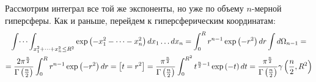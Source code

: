 \documentclass[14pt]{article}
\newcommand{\lb}{\left(}
\newcommand{\rb}{\right)}
\begin{document}
Рассмотрим интеграл все той же экспоненты, но уже по объему $n$-мерной гиперсферы. Как и раньше, перейдем к гиперсферическим координатам:
\begin{gather}
	\int \dots \int_{x_1^2 + \dots + x_n^2 \leq R^2} \exp \lb -x_1^2 - \dots - x_n^2 \rb dx_1 \dots dx_n = \int_{0}^{R} r^{n-1} \exp \lb -r^2 \rb dr \int d \Omega_{n-1} = \notag \\
	= \frac{2 \pi^{\frac{n}{2}}}{\Gamma \lb \frac{n}{2} \rb} \int_{0}^{R} r^{n-1} \exp \lb -r^2 \rb dr = \left[ t = r^2 \right] = \frac{\pi^{\frac{n}{2}}}{\Gamma \lb \frac{n}{2} \rb} \int_{0}^{R^2} t^{\frac{n}{2} - 1} \exp \lb -t \rb dt = \frac{\pi^{\frac{n}{2}}}{\Gamma \lb \frac{n}{2} \rb} \gamma \lb \frac{n}{2}, R^2 \rb \notag
\end{gather}
\end{document}
